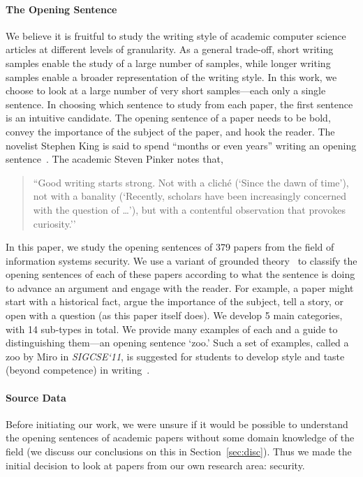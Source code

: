 \documentclass[sigconf]{acmart}
\begin{document}
\paragraph{The Opening Sentence}

We believe it is fruitful to study the writing style of academic computer science articles at different levels of granularity. As a general trade-off, short writing samples enable the study of a large number of samples, while longer writing samples enable a broader representation of the writing style. In this work, we choose to look at a large number of very short samples---each only a single sentence. In choosing which sentence to study from each paper, the first sentence is an intuitive candidate. The opening sentence of a paper needs to be bold, convey the importance of the subject of the paper, and hook the reader. The novelist Stephen King is said to spend ``months or even years'' writing an opening sentence~\cite{Fas13}. The academic Steven Pinker notes that,

\begin{quote}
``Good writing starts strong. Not with a cliché (`Since the dawn of time’), not with a banality (`Recently, scholars have been increasingly concerned with the question of …’), but with a contentful observation that provokes curiosity.''~\cite{Pin15}
\end{quote}

In this paper, we study the opening sentences of 379 papers from the field of information systems security. We use a variant of grounded theory~\cite{glaser1968discovery} to classify the opening sentences of each of these papers according to what the sentence is doing to advance an argument and engage with the reader. For example, a paper might start with a historical fact, argue the importance of the subject, tell a story, or open with a question (as this paper itself does). We develop 5 main categories, with 14 sub-types in total. We provide many examples of each and a guide to distinguishing them---an opening sentence `zoo.' Such a set of examples, called a zoo by Miro in \textit{SIGCSE`11}, is suggested for students to develop style and taste (beyond competence) in writing~\cite{Mir11}. 

\paragraph{Source Data} Before initiating our work, we were unsure if it would be possible to understand the opening sentences of academic papers without some domain knowledge of the field (we discuss our conclusions on this in Section~\ref{sec:disc}). Thus we made the initial decision to look at papers from our own research area: security.
\end{document}
